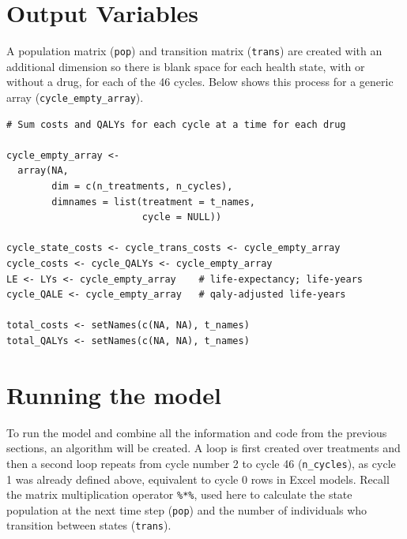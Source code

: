 \documentclass[a4paper,twoside,openany]{../svmonoBUGS}\usepackage[]{graphicx}\usepackage[]{color}
\begin{document}
\section{Output Variables}
A population matrix (\texttt{pop}) and transition matrix (\texttt{trans}) are created with an additional dimension so there is blank space for each health state, with or without a drug, for each of the 46 cycles. Below shows this process for a generic array (\texttt{cycle\_empty\_array}).

\begin{verbatim}
# Sum costs and QALYs for each cycle at a time for each drug 

cycle_empty_array <-
  array(NA,
        dim = c(n_treatments, n_cycles),
        dimnames = list(treatment = t_names,
                        cycle = NULL))

cycle_state_costs <- cycle_trans_costs <- cycle_empty_array
cycle_costs <- cycle_QALYs <- cycle_empty_array
LE <- LYs <- cycle_empty_array    # life-expectancy; life-years
cycle_QALE <- cycle_empty_array   # qaly-adjusted life-years

total_costs <- setNames(c(NA, NA), t_names)
total_QALYs <- setNames(c(NA, NA), t_names)
\end{verbatim}

\section{Running the model}
To run the model and combine all the information and code from the previous sections, an algorithm will be created.
A loop is first created over treatments and then a second loop repeats from cycle number 2 to cycle 46 (\texttt{n\_cycles}), as cycle 1 was already defined above, equivalent to cycle 0 rows in Excel models. Recall the matrix multiplication operator \texttt{\%*\%}, used here to calculate the state population at the next time step (\texttt{pop}) and the number of individuals who transition between states (\texttt{trans}).
\end{document}
